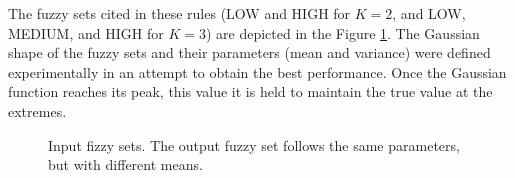 \documentclass[english]{sobraep}
\begin{document}
The fuzzy sets cited in these rules (LOW and HIGH for \(K=2\), and LOW, MEDIUM, and HIGH for \(K=3\)) are depicted in the Figure \ref{fig:input-fuzzy-sets}. The Gaussian shape of the fuzzy sets and their parameters (mean and variance) were defined experimentally in an attempt to obtain the best performance. Once the Gaussian function reaches its peak, this value it is held to maintain the true value at the extremes.
\begin{figure}[htp]
    
    
    \caption{Input fizzy sets. The output fuzzy set follows the same parameters, but with different means.}
    \label{fig:input-fuzzy-sets}
\end{figure}
\end{document}
